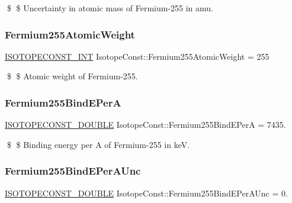 \$ \$ Uncertainty in atomic mass of Fermium-\/255 in amu. \mbox{\label{group___isotope_const-_fermium-_fm255_ga3d4c7dc3b6f23a3c10f6ec70162ac2b4}} 
\subsubsection{\texorpdfstring{Fermium255\+Atomic\+Weight}{Fermium255AtomicWeight}}
{\footnotesize\ttfamily \mbox{\hyperlink{group___isotope_const-_macros_ga5f18360b3e99483a35c32d789e62621c}{I\+S\+O\+T\+O\+P\+E\+C\+O\+N\+S\+T\+\_\+\+I\+NT}} Isotope\+Const\+::\+Fermium255\+Atomic\+Weight = 255}

\$ \$ Atomic weight of Fermium-\/255. \mbox{\label{group___isotope_const-_fermium-_fm255_gafd9bbb0d9befcb0e3bdb31494a3e7d00}} 
\subsubsection{\texorpdfstring{Fermium255\+Bind\+E\+PerA}{Fermium255BindEPerA}}
{\footnotesize\ttfamily \mbox{\hyperlink{group___isotope_const-_macros_ga8f45a7272ce02c0b4c65c44636ed719a}{I\+S\+O\+T\+O\+P\+E\+C\+O\+N\+S\+T\+\_\+\+D\+O\+U\+B\+LE}} Isotope\+Const\+::\+Fermium255\+Bind\+E\+PerA = 7435.}

\$ \$ Binding energy per A of Fermium-\/255 in keV. \mbox{\label{group___isotope_const-_fermium-_fm255_ga534496cf258ffad10f598ab69ba6b1f6}} 
\subsubsection{\texorpdfstring{Fermium255\+Bind\+E\+Per\+A\+Unc}{Fermium255BindEPerAUnc}}
{\footnotesize\ttfamily \mbox{\hyperlink{group___isotope_const-_macros_ga8f45a7272ce02c0b4c65c44636ed719a}{I\+S\+O\+T\+O\+P\+E\+C\+O\+N\+S\+T\+\_\+\+D\+O\+U\+B\+LE}} Isotope\+Const\+::\+Fermium255\+Bind\+E\+Per\+A\+Unc = 0.}

